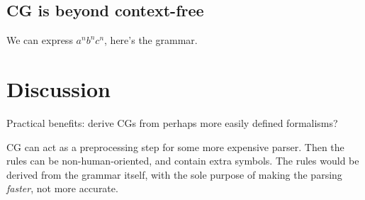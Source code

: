\documentclass[11pt]{article}
\begin{document}
\subsection{CG is beyond context-free}

We can express $a^nb^nc^n$, here's the grammar.  

\section{Discussion}

Practical benefits: derive CGs from perhaps more easily defined formalisms?

CG can act as a preprocessing step for some more expensive parser. Then the rules can be non-human-oriented, and contain extra symbols. The rules would be derived from the grammar itself, with the sole purpose of making the parsing \emph{faster}, not more accurate.









\end{document}
